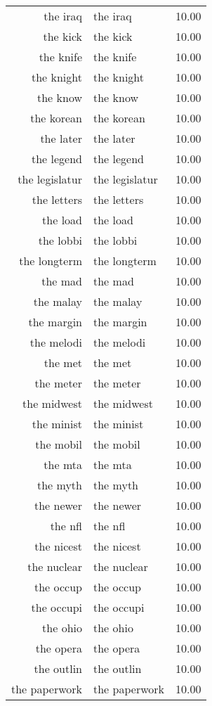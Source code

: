 \begin{table}[ht]
\begin{tabular}{rlr}
  the iraq & the iraq & 10.00 \\ 
  the kick & the kick & 10.00 \\ 
  the knife & the knife & 10.00 \\ 
  the knight & the knight & 10.00 \\ 
  the know & the know & 10.00 \\ 
  the korean & the korean & 10.00 \\ 
  the later & the later & 10.00 \\ 
  the legend & the legend & 10.00 \\ 
  the legislatur & the legislatur & 10.00 \\ 
  the letters & the letters & 10.00 \\ 
  the load & the load & 10.00 \\ 
  the lobbi & the lobbi & 10.00 \\ 
  the longterm & the longterm & 10.00 \\ 
  the mad & the mad & 10.00 \\ 
  the malay & the malay & 10.00 \\ 
  the margin & the margin & 10.00 \\ 
  the melodi & the melodi & 10.00 \\ 
  the met & the met & 10.00 \\ 
  the meter & the meter & 10.00 \\ 
  the midwest & the midwest & 10.00 \\ 
  the minist & the minist & 10.00 \\ 
  the mobil & the mobil & 10.00 \\ 
  the mta & the mta & 10.00 \\ 
  the myth & the myth & 10.00 \\ 
  the newer & the newer & 10.00 \\ 
  the nfl & the nfl & 10.00 \\ 
  the nicest & the nicest & 10.00 \\ 
  the nuclear & the nuclear & 10.00 \\ 
  the occup & the occup & 10.00 \\ 
  the occupi & the occupi & 10.00 \\ 
  the ohio & the ohio & 10.00 \\ 
  the opera & the opera & 10.00 \\ 
  the outlin & the outlin & 10.00 \\ 
  the paperwork & the paperwork & 10.00 \\ 

\end{tabular}
\end{table}
